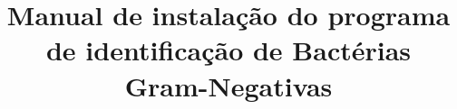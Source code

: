 \documentclass[]{article}
\title{Manual de instalação do programa de identificação de Bactérias Gram-Negativas}
\begin{document}
\maketitle

\begin{abstract}

\end{abstract}

\section{}
\end{document}

